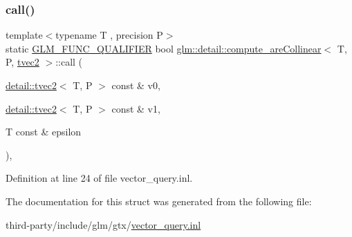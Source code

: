 \subsubsection{\texorpdfstring{call()}{call()}}
{\footnotesize\ttfamily template$<$typename T , precision P$>$ \\
static \hyperlink{setup_8hpp_a33fdea6f91c5f834105f7415e2a64407}{G\+L\+M\+\_\+\+F\+U\+N\+C\+\_\+\+Q\+U\+A\+L\+I\+F\+I\+ER} bool \hyperlink{structglm_1_1detail_1_1compute__are_collinear}{glm\+::detail\+::compute\+\_\+are\+Collinear}$<$ T, P, \hyperlink{structglm_1_1detail_1_1tvec2}{tvec2} $>$\+::call (\begin{DoxyParamCaption}\item[{\hyperlink{structglm_1_1detail_1_1tvec2}{detail\+::tvec2}$<$ T, P $>$ const \&}]{v0,  }\item[{\hyperlink{structglm_1_1detail_1_1tvec2}{detail\+::tvec2}$<$ T, P $>$ const \&}]{v1,  }\item[{T const \&}]{epsilon }\end{DoxyParamCaption})\hspace{0.3cm}{\ttfamily [inline]}, {\ttfamily [static]}}



Definition at line 24 of file vector\+\_\+query.\+inl.



The documentation for this struct was generated from the following file\+:\begin{DoxyCompactItemize}
\item 
third-\/party/include/glm/gtx/\hyperlink{vector__query_8inl}{vector\+\_\+query.\+inl}\end{DoxyCompactItemize}
